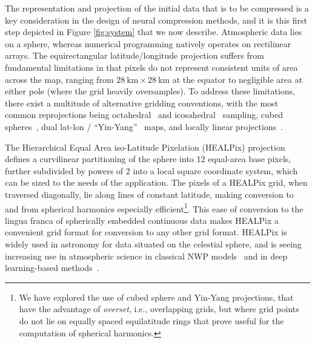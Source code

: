 \documentclass[11pt, a4paper, logo, copyright, numbering]{googledeepmind}
\begin{document}
The representation and projection of the initial data that is to be compressed is a key consideration in the design of neural compression methods, and it is this first step depicted in Figure \ref{fig:system} that we now describe. 
Atmospheric data lies on a sphere, whereas numerical programming natively operates on rectilinear arrays. 
The equirectangular latitude/longitude projection suffers from fundamental limitations in that pixels do not represent consistent units of area across the map, ranging from $28~\text{km} \times 28~\text{km}$ at the equator to negligible area at either pole (where the grid heavily oversamples).
To address these limitations, there exist a multitude of alternative gridding conventions, with the most common reprojections being octahedral~\citep{smolarkiewicz2016fvm} and icosahedral~\citep{zangl2015icon} sampling, cubed spheres~\citep{lin1997cubedsphere,ronchi1996cubed}, dual lat-lon / ``Yin-Yang''~\citep{cote1998gem,ohno2009visualization} maps, and locally linear projections~\citep{metoffice2016data}.





The Hierarchical Equal Area iso-Latitude Pixelation (HEALPix) projection~\citep{gorski1999healpix} defines a curvilinear partitioning of the sphere into 12 equal-area base pixels, further subdivided by powers of 2 into a local square coordinate system, which can be sized to the needs of the application.
The pixels of a HEALPix grid, when traversed diagonally, lie along lines of constant latitude, making conversion to and from spherical harmonics especially efficient\footnote{We have explored the use of cubed sphere \citep{ronchi1996cubed,lin1997cubedsphere} and Yin-Yang \citep{cote1998gem,ohno2009visualization} projections, that have the advantage of \emph{overset}, i.e., overlapping grids, but where grid points do not lie on equally spaced equilatitude rings that prove useful for the computation of spherical harmonics.}.
This ease of conversion to the lingua franca of spherically embedded continuous data makes HEALPix a convenient grid format for conversion to any other grid format.
HEALPix is widely used in astronomy for data situated on the celestial sphere, and is seeing increasing use in atmospheric science in classical NWP models~\citep{karlbauer2023advancing} and in deep learning-based methods~\citep{ramavajjala2024heal, chang2023seamless}. 
\end{document}

